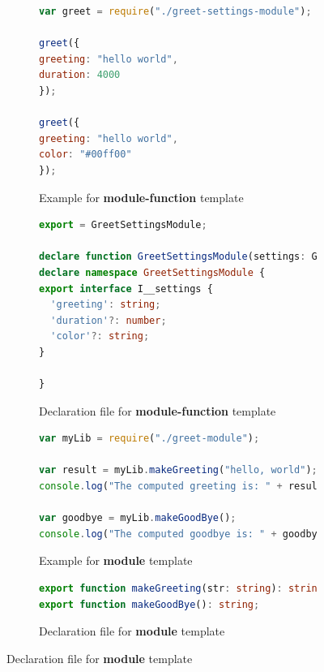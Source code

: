 \documentclass[sigconf]{acmart}
\begin{document}
\begin{figure}[t]
\centering
\begin{subfigure}[t]{0.48\linewidth}
  \begin{lstlisting}[language=JavaScript,numbers=none]
var greet = require("./greet-settings-module");

greet({
greeting: "hello world",
duration: 4000
});

greet({
greeting: "hello world",
color: "#00ff00"
});
  \end{lstlisting}
  \caption{Example for \textbf{module-function} template}
  \label{fig:example-module-function}
\end{subfigure}
\hfill
\begin{subfigure}[t]{0.48\linewidth}
  \begin{lstlisting}[language=TypeScript,numbers=none]
export = GreetSettingsModule;

declare function GreetSettingsModule(settings: GreetSettingsModule.I__settings): void;
declare namespace GreetSettingsModule {
export interface I__settings {
  'greeting': string;
  'duration'?: number;
  'color'?: string;
}

}
  \end{lstlisting}
  \caption{Declaration file for \textbf{module-function} template}
  \label{fig:template-module-function}
\end{subfigure}

\begin{subfigure}[t]{0.48\linewidth}
    \begin{lstlisting}[language=JavaScript,numbers=none]
var myLib = require("./greet-module");

var result = myLib.makeGreeting("hello, world");
console.log("The computed greeting is: " + result);

var goodbye = myLib.makeGoodBye();
console.log("The computed goodbye is: " + goodbye);    
    \end{lstlisting}
  \caption{Example for \textbf{module} template}
  \label{fig:example-module}
  \end{subfigure}
  \hfill
  \begin{subfigure}[t]{0.48\linewidth}
    \begin{lstlisting}[language=TypeScript,numbers=none]
export function makeGreeting(str: string): string;
export function makeGoodBye(): string;        
    \end{lstlisting}
    \caption{Declaration file for \textbf{module} template}
    \label{fig:template-module}
  \end{subfigure}


\end{figure}
\end{document}
